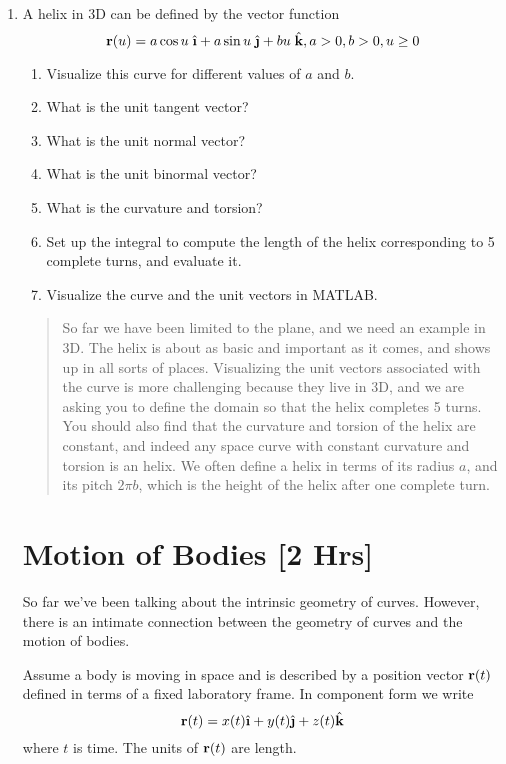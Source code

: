 \documentclass[M3_Night1_Solutions]{subfiles}
\begin{document}
\begin{enumerate}[series=exercises, label=\textbf{Exercise} (\arabic*)]
\item A helix in 3D can be defined by the vector function
\[ \r(u) = a \cos u \; \ihat + a \sin u \; \jhat + bu \; \khat, a>0, b>0, u \ge 0 \]
\begin{enumerate}
\item Visualize this curve for different values of $a$ and $b$. 
\item What is the unit tangent vector? 
\item What is the unit normal vector?
\item What is the unit binormal vector? 
\item What is the curvature and torsion?
\item Set up the integral to compute the length of the helix corresponding to 5 complete turns, and evaluate it.
\item Visualize the curve and the unit vectors in MATLAB.
\end{enumerate}
\begin{quote}
So far we have been limited to the plane, and we need an example in 3D. The helix is about as basic and important as it comes, and shows up in all sorts of places. Visualizing the unit vectors associated with the curve is more challenging because they live in 3D, and we are asking you to define the domain so that the helix completes 5 turns. You should also find that the curvature and torsion of the helix are constant, and indeed any space curve with constant curvature and torsion is an helix. We often define a helix in terms of its radius $a$, and its pitch $2 \pi b$, which is the height of the helix after one complete turn.
\end{quote}
\ee

\clearpage

\section{Motion of Bodies [2 Hrs]}

So far we've been talking about the intrinsic geometry of curves. However, there is an intimate connection between the geometry of curves and the motion of bodies.

Assume a body is moving in space and is described by a position vector $\mathbf{r}(t)$ defined in terms of a fixed laboratory frame. In component form we write
\[\r(t) = x(t) \ihat + y(t) \jhat + z(t) \khat \]
where $t$ is time. The units of $\mathbf{r}(t)$ are length.


\end{enumerate}
\end{document}
